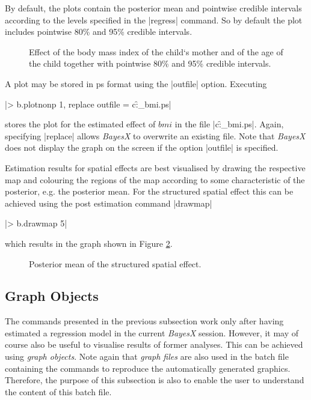 By default, the plots contain the posterior mean and pointwise credible intervals according to the levels specified in the
|regress| command. So by default the plot includes pointwise 80\% and 95\% credible intervals.

\begin{figure}[ht]
\begin{center}
 {\it\caption{Effect of
the body mass index of the child`s mother and of the age of the
child together with pointwise 80\% and 95\% credible intervals.
\label{mcmc:bmi1}}}
\end{center}
\end{figure}

A plot may be stored in ps format using the |outfile| option. Executing

|> b.plotnonp 1, replace outfile = c:\data\f_bmi.ps|

stores the plot for the estimated effect of $\mathit{bmi}$ in the file |c:\data\f_bmi.ps|. Again, specifying |replace| allows
{\it BayesX} to overwrite an existing file. Note that {\it BayesX} does not display the graph on the screen if the option
|outfile| is specified.

Estimation results for spatial effects are best visualised by drawing the respective map and colouring the regions of the map
according to some characteristic of the posterior, e.g. the posterior mean. For the structured spatial effect this can be
achieved using the post estimation command |drawmap|

|> b.drawmap 5|

which results in the graph shown in Figure \ref{mcmc:spat1}.

\begin{figure}[ht]
\begin{center}
{\it\caption{Posterior mean of the structured spatial
effect.\label{mcmc:spat1}}}
\end{center}
\end{figure}

\subsection{Graph Objects}

The commands presented in the previous subsection work only after having estimated a regression model in the current {\it
BayesX} session. However, it may of course also be useful to visualise results of former analyses. This can be achieved using
{\it graph objects}. Note again that {\it graph files} are also used in the batch file containing the commands to reproduce the
automatically generated graphics. Therefore, the purpose of this subsection is also to enable the user to understand the
content of this batch file.

